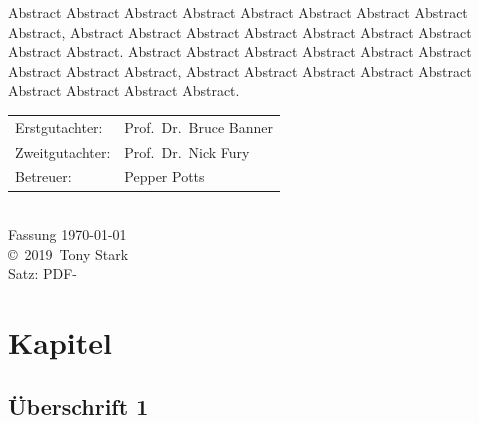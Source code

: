 \documentclass[a4paper,10pt
headsepline,           %
doubleside,            %
pointlessnumbers,      %
bibtotoc,              %
BCOR15mm,               %
leqno					%
]{scrbook}
\newcommand{\fullname}{Tony Stark}
\newcommand{\jahr}{2019}
\newcommand{\gutachterA}{Prof.\ Dr.\ Bruce Banner}
\newcommand{\gutachterB}{Prof.\ Dr.\ Nick Fury}
\newcommand{\betreuer}{Pepper Potts}
\begin{document}
Abstract Abstract Abstract Abstract Abstract Abstract Abstract Abstract Abstract,
Abstract Abstract Abstract Abstract Abstract Abstract Abstract Abstract Abstract.
Abstract Abstract Abstract Abstract Abstract Abstract Abstract Abstract Abstract,
Abstract Abstract Abstract Abstract Abstract Abstract Abstract Abstract Abstract.
{
	\null
	\small
	\vfill
	\begin{center}
		\begin{tabular}{l l}
			Erstgutachter:  & \gutachterA \\
			Zweitgutachter: & \gutachterB \\
			Betreuer:       & \betreuer \\
		\end{tabular}\\[1cm]
		Fassung \today\\
		  \copyright~\jahr~\fullname\\[0.5em]
		
		Satz: PDF-\LaTeXe
	\end{center}
}


\tableofcontents

\mainmatter %


\chapter{Kapitel}

\section{Überschrift 1}
\end{document}
